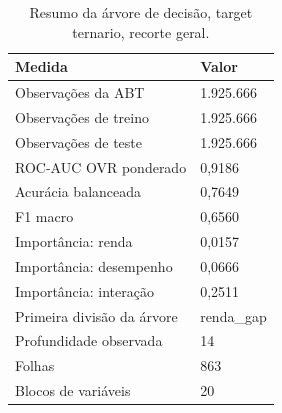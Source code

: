 \begin{table}
\caption{Resumo da árvore de decisão, target ternario, recorte geral.}
\label{tab:tabela_treeClassification_ternario_recorte_geral_principal_in_sample_e5}
\begin{tabular}{ll}
\toprule
Medida & Valor \\
\midrule
Observações da ABT & 1.925.666 \\
Observações de treino & 1.925.666 \\
Observações de teste & 1.925.666 \\
ROC-AUC OVR ponderado & 0,9186 \\
Acurácia balanceada & 0,7649 \\
F1 macro & 0,6560 \\
Importância: renda & 0,0157 \\
Importância: desempenho & 0,0666 \\
Importância: interação & 0,2511 \\
Primeira divisão da árvore & renda\_gap \\
Profundidade observada & 14 \\
Folhas & 863 \\
Blocos de variáveis & 20 \\
\bottomrule
\end{tabular}
\end{table}
